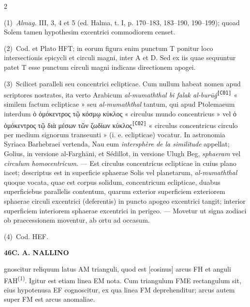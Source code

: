 \documentclass[10pt]{article}
\newcommand{\A}[1]{\hypertarget{#1}{}}
\newcommand{\NM}[1]{\textsuperscript{(#1)}}
\newcommand{\NN}[2]{\par\noindent\textup{(#1)}\ #2}
\newcommand{\GR}[1]{\textgreek{#1}}
\newcommand{\U}[1]{\textsuperscript{\texttt{[#1]}}}
\newcommand{\SP}[3]{%
  \clearpage
  \A{AB01-PDF#1}%
  \begin{center}\textbf{#2\quad #3}\end{center}%
}
\begin{document}
\begin{multicols}{2}
\footnotesize

\A{AB01-PDF0134-N01}
\NN{1}{\textit{Almag.} III, 3, 4 et 5
(ed. Halma, t. I, p. 170–183, 183–190, 190–199);
quoad Solem tamen hypothesim excentrici commodiorem censet.}

\A{AB01-PDF0134-N02}
\NN{2}{Cod. et Plato HFT; in eorum figura enim punctum T
ponitur loco intersectionis epicycli et circuli magni,
inter A et D. Sed ex iis quae sequuntur patet T esse punctum
circuli magni indicans directionem apogei.}

\A{AB01-PDF0134-N03}
\NN{3}{Scilicet paralleli seu concentrici eclipticae.
Cum nullum habeat nomen apud scriptores nostrates, ita verto
Arabicum \textit{al-mumaththal bi falak al-burūǵ}\U{C01}
« similem factum eclipticae » seu \textit{al-mumaththal}
tantum, qui apud Ptolemaeum interdum
\GR{ὁ ὁμόκεντρος τῷ κόσμῳ κύκλος}
« circulus mundo concentricus » vel
\GR{ὁ ὁμόκεντρος τῷ διὰ μέσων τῶν ζωδίων κύκλος}\U{C02}
« circulus concentricus circulo per medium signorum
transeunti » (i. e. eclipticae) vocatur. In astronomia
Syriaca Barhebraei vertenda, Nau eum
\textit{intersphère de la similitude} appellat; Golius,
in versione al-Farghāni, et Sédillot, in versione Ulugh Beg,
\textit{sphaeram} vel \textit{circulum homocentricum}.
— Est circulus concentricus eclipticae in cuius plano iacet;
descriptus est in superficie sphaerae Solis vel planetarum,
\textit{al-mumaththal} quoque vocata, quae est corpus solidum,
concentricum eclipticae, duabus superficiebus parallelis
contentum, quarum exterior superficiem exteriorem sphaerae
circuli excentrici (deferentis) in puncto apogeo excentrici
tangit; interior superficiem interiorem sphaerae excentrici
in perigeo. — Movetur ut signa zodiaci ob praecessionem
moventur, ab ortu ad occasum.}

\A{AB01-PDF0134-N04}
\NN{4}{Cod. HEF.}

\end{multicols}


\SP{0135}{46}{C. A. NALLINO}

\A{AB01-PDF0135-P01}
gnoscitur reliquum latus AM trianguli, quod est [cosinus]
arcus FH et anguli FAH\NM{1}. Igitur est etiam linea EM nota.
Cum triangulum FME rectangulum sit, eius hypotenusa EF
cognoscitur, ex qua linea FM deprehenditur; arcus autem super
FM est arcus anomaliae.
\end{document}
